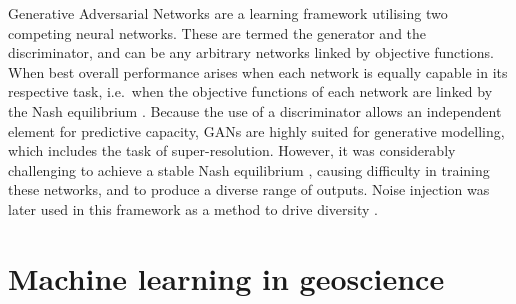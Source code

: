 \documentclass[manuscript.tex]{subfiles}
\begin{document}
Generative Adversarial Networks \parencite{goodfellowGenerativeAdversarialNets2014} are a learning framework utilising two competing neural networks.
These are termed the generator and the discriminator, and can be any arbitrary networks linked by objective functions.
When best overall performance arises when each network is equally capable in its respective task, i.e.\ when the objective functions of each network are linked by the Nash equilibrium \parencite{salimansImprovedTechniquesTraining2016,lucicAreGANsCreated2018}.
Because the use of a discriminator allows an independent element for predictive capacity, GANs are highly suited for generative modelling, which includes the task of super-resolution.
However, it was considerably challenging to achieve a stable Nash equilibrium \parencite{salimansImprovedTechniquesTraining2016}, causing difficulty in training these networks, and to produce a diverse range of outputs.
Noise injection was later used in this framework as a method to drive diversity \parencite{karrasStylebasedGeneratorArchitecture2018,rakotonirinaESRGANFurtherImproving2020}.




\section{Machine learning in geoscience}
\label{sec:introgeoml}
\end{document}
